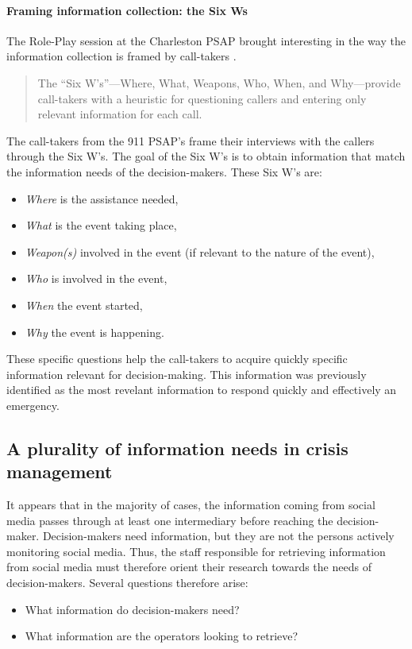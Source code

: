 \paragraph{Framing information collection: the Six Ws}
\label{sec:sixws}
The Role-Play session at the Charleston PSAP brought interesting in the way the information collection is framed by call-takers \parencite{kropczynskiIdentifyingActionableInformation2018}.
\blockquote{The “Six W’s”—Where, What, Weapons, Who, When, and Why—provide call-takers with
    a heuristic for questioning callers and entering only relevant information for each call.}
The call-takers from the 911 PSAP's frame their interviews with the callers through the Six W's.
The goal of the Six W's is to obtain information that match the information needs of the decision-makers.
These Six W's are:
\begin{itemize}
    \item \textit{Where} is the assistance needed,
    \item \textit{What} is the event taking place,
    \item \textit{Weapon(s)} involved in the event (if relevant to the nature of the event),
    \item \textit{Who} is involved in the event,
    \item \textit{When} the event started,
    \item \textit{Why} the event is happening.
\end{itemize}
These specific questions help the call-takers to acquire quickly specific information relevant for decision-making.
This information was previously identified as the most revelant information to respond quickly and effectively an emergency.

\subsection{A plurality of information needs in crisis management}
It appears that in the majority of cases, the information coming from social media passes through at least one intermediary before reaching the decision-maker.
Decision-makers need information, but they are not the persons actively monitoring social media.
Thus, the staff responsible for retrieving information from social media must therefore orient their research towards the needs of decision-makers.
Several questions therefore arise:

\begin{itemize}
    \item What information do decision-makers need?
    \item What information are the operators looking to retrieve?
\end{itemize}

